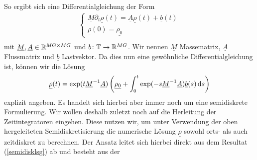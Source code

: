 So ergibt sich eine Differential\-gleichung der Form
\begin{align*}
\begin{cases}
\underline{M} \partial_t \underline{\rho}(t) = \underline{A} \underline{\rho}(t) + \underline{b}(t) \\
\underline{\rho}(0) = \underline{\rho_0}
\end{cases}\\
\end{align*}
mit $ \underline{M},\underline{A} \in \mathbb{R}^{MG\times MG} $ und $ b\colon \mathbb{T} \to \mathbb{R}^{MG} $. Wir nennen  $ \underline{M} $ Massematrix, $ \underline{A} $ Flussmatrix und $ \underline{b} $ Lastvektor.
Da dies nun eine gewöhnliche Differentialgleichung ist, können wir die Lösung 
\begin{align}
 \label{semidisklsg}
 \underline{\rho}(t) = \exp(t \underline{M}^{-1} \underline{A}) \left( \underline{\rho_0} + \int_{0}^{t} \exp(-s\underline{M}^{-1} \underline{A}) \underline{b}(s) \, \mathrm{d} s \right)
\end{align}
explizit angeben.
Es handelt sich hierbei aber immer noch um eine semidiskrete Formulierung. 
Wir wollen deshalb zuletzt noch auf die Herleitung der Zeitintegratoren eingehen. Diese nutzen wir, um unter Verwendung der oben hergeleiteten Semidiskretisierung die numerische Lösung $ \underline{\rho} $ sowohl orts- als auch zeitdiskret zu berechnen. Der Ansatz leitet sich hierbei direkt aus dem Resultat (\ref{semidisklsg}) ab und besteht aus der 

